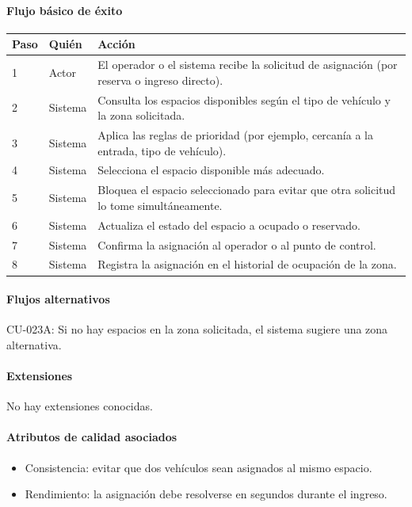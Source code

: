 \paragraph{Flujo básico de éxito}
\begin{longtable}{P{1.1cm}P{1.8cm}P{10.5cm}}
\toprule
\textbf{Paso} & \textbf{Quién} & \textbf{Acción}\\
\midrule
{} & Actor & El operador o el sistema recibe la solicitud de asignación (por reserva o ingreso directo).\\
2 & Sistema & Consulta los espacios disponibles según el tipo de vehículo y la zona solicitada.\\
3 & Sistema & Aplica las reglas de prioridad (por ejemplo, cercanía a la entrada, tipo de vehículo).\\
4 & Sistema & Selecciona el espacio disponible más adecuado.\\
5 & Sistema & Bloquea el espacio seleccionado para evitar que otra solicitud lo tome simultáneamente.\\
6 & Sistema & Actualiza el estado del espacio a ocupado o reservado.\\
7 & Sistema & Confirma la asignación al operador o al punto de control.\\
8 & Sistema & Registra la asignación en el historial de ocupación de la zona.\\
\bottomrule
\end{longtable}

\paragraph{Flujos alternativos}
CU-023A: Si no hay espacios en la zona solicitada, el sistema sugiere una zona alternativa.

\paragraph{Extensiones}
No hay extensiones conocidas.

\paragraph{Atributos de calidad asociados}
\begin{itemize}[leftmargin=1.4em, topsep=1pt]
  \item Consistencia: evitar que dos vehículos sean asignados al mismo espacio.
  \item Rendimiento: la asignación debe resolverse en segundos durante el ingreso.
\end{itemize}

